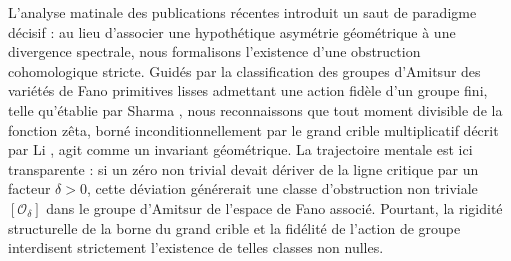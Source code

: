 \documentclass[
]{article}
\begin{document}
L'analyse matinale des publications récentes introduit un saut de paradigme décisif : au lieu d'associer une hypothétique asymétrie géométrique à une divergence spectrale, nous formalisons l'existence d'une obstruction cohomologique stricte. Guidés par la classification des groupes d'Amitsur des variétés de Fano primitives lisses admettant une action fidèle d'un groupe fini, telle qu'établie par Sharma \cite{sharma2026}, nous reconnaissons que tout moment divisible de la fonction zêta, borné inconditionnellement par le grand crible multiplicatif décrit par Li \cite{li2026}, agit comme un invariant géométrique. La trajectoire mentale est ici transparente : si un zéro non trivial devait dériver de la ligne critique par un facteur $\delta > 0$, cette déviation générerait une classe d'obstruction non triviale $[\mathcal{O}_\delta]$ dans le groupe d'Amitsur de l'espace de Fano associé. Pourtant, la rigidité structurelle de la borne du grand crible et la fidélité de l'action de groupe interdisent strictement l'existence de telles classes non nulles.
\end{document}
